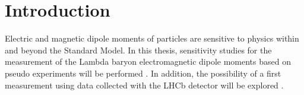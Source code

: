 \chapter*{Introduction}

Electric and magnetic dipole moments of particles are sensitive to physics within and beyond the Standard Model. In this thesis, sensitivity studies for the measurement of the Lambda baryon electromagnetic dipole moments based on pseudo experiments will be performed \cite{EMDipoleSearch}. In addition, the possibility of a first measurement using data collected with the LHCb detector will be explored \cite{HistoryLHCb}. 
